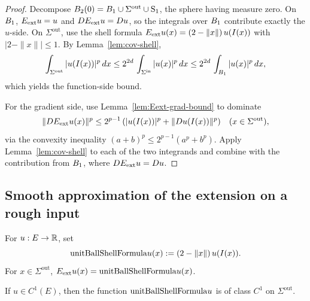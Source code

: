 \begin{proof}
\leanok
{}

Decompose $B_{2}(0) = B_{1} \cup \Sigma^{\mathrm{out}} \cup \mathrm{S}_1$,
the sphere having measure zero. On $B_{1}$, $E_{\mathrm{ext}} u = u$ and
$DE_{\mathrm{ext}} u = Du$, so the integrals over $B_{1}$ contribute exactly the
$u$-side. On $\Sigma^{\mathrm{out}}$, use the shell formula
$E_{\mathrm{ext}} u (x) = (2-\|x\|)\, u(I(x))$ with $|2-\|x\|| \le 1$. By
Lemma~\ref{lem:cov-shell},
\begin{equation*}
\int_{\Sigma^{\mathrm{out}}} |u(I(x))|^p\,dx
\le 2^{2d}\,\int_{\Sigma^{\mathrm{in}}} |u(x)|^p\,dx
\le 2^{2d}\,\int_{B_{1}} |u(x)|^p\,dx,
\end{equation*}
which yields the function-side bound.

For the gradient side, use Lemma~\ref{lem:Eext-grad-bound} to dominate
\begin{equation*}
\|DE_{\mathrm{ext}} u(x)\|^p \le 2^{p-1}\,(|u(I(x))|^p + \|Du(I(x))\|^p)
\quad (x \in \Sigma^{\mathrm{out}}),
\end{equation*}
via the convexity inequality $(a+b)^p \le 2^{p-1}(a^p+b^p)$. Apply
Lemma~\ref{lem:cov-shell} to each of the two integrands and combine with
the contribution from $B_{1}$, where $DE_{\mathrm{ext}} u = Du$.
\end{proof}

\subsection*{Smooth approximation of the extension on a rough input}

\begin{definition}
\label{def:unitBallShellFormula}
\leanok
For $u : E \to \mathbb{R}$, set
\begin{equation*}
\mathrm{unitBallShellFormula} u(x) := (2 - \|x\|)\, u(I(x)).
\end{equation*}
For $x \in \Sigma^{\mathrm{out}}$, $E_{\mathrm{ext}} u (x) = \mathrm{unitBallShellFormula} u(x)$.
\end{definition}

\begin{lemma}
\label{lem:contDiffOn_unitBallShellFormula}
\leanok
{}
If $u \in C^1(E)$, then the function $\mathrm{unitBallShellFormula} u$ is of
class $C^1$ on $\Sigma^{\mathrm{out}}$.
\end{lemma}

